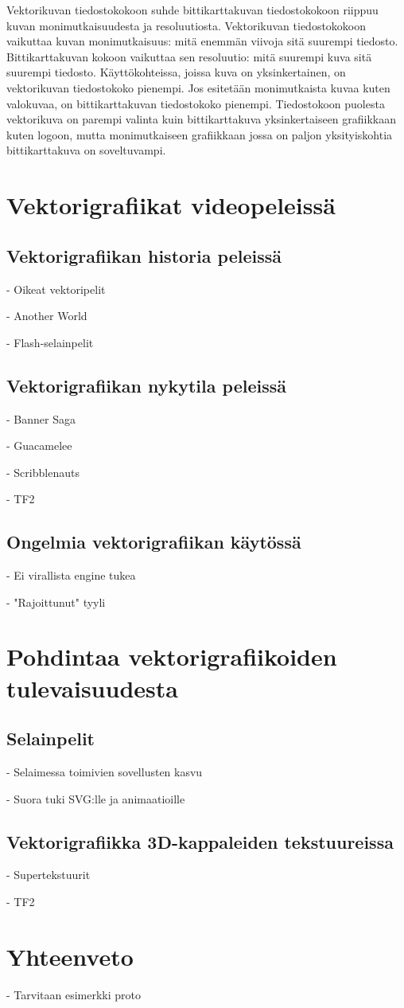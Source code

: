 \documentclass[utf8,bachelor]{gradu3}
\begin{document}
Vektorikuvan tiedostokokoon suhde bittikarttakuvan tiedostokokoon riippuu kuvan monimutkaisuudesta ja resoluutiosta. Vektorikuvan tiedostokokoon vaikuttaa kuvan monimutkaisuus: mitä enemmän viivoja sitä suurempi tiedosto. Bittikarttakuvan kokoon vaikuttaa sen resoluutio: mitä suurempi kuva sitä suurempi tiedosto. Käyttökohteissa, joissa kuva on yksinkertainen, on vektorikuvan tiedostokoko pienempi. Jos esitetään monimutkaista kuvaa kuten valokuvaa, on bittikarttakuvan tiedostokoko pienempi. Tiedostokoon puolesta vektorikuva on parempi valinta kuin bittikarttakuva yksinkertaiseen grafiikkaan kuten logoon, mutta monimutkaiseen grafiikkaan jossa on paljon yksityiskohtia bittikarttakuva on soveltuvampi. \parencite{RefWorks:doc:5bdf4af9e4b0f02deeb8a48a}

\chapter{Vektorigrafiikat videopeleissä}

\section{Vektorigrafiikan historia peleissä}

- Oikeat vektoripelit

- Another World

- Flash-selainpelit

\section{Vektorigrafiikan nykytila peleissä}

- Banner Saga

- Guacamelee

- Scribblenauts

- TF2

\section{Ongelmia vektorigrafiikan käytössä}

- Ei virallista engine tukea

- "Rajoittunut" tyyli

\chapter{Pohdintaa vektorigrafiikoiden tulevaisuudesta}

\section{Selainpelit}

- Selaimessa toimivien sovellusten kasvu

- Suora tuki SVG:lle ja animaatioille

\section{Vektorigrafiikka 3D-kappaleiden tekstuureissa}

- Supertekstuurit

- TF2

\chapter{Yhteenveto}

- Tarvitaan esimerkki proto

\printbibliography
\end{document}
